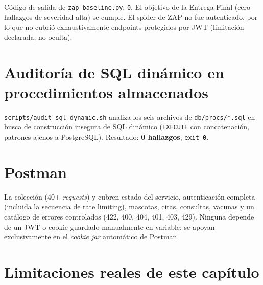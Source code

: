 C\'odigo de salida de \texttt{zap-baseline.py}: \texttt{0}. El objetivo de
la Entrega Final (cero hallazgos de severidad alta) se cumple. El spider de
ZAP no fue autenticado, por lo que no cubri\'o exhaustivamente endpoints
protegidos por JWT (limitaci\'on declarada, no oculta).

\section{Auditor\'ia de SQL din\'amico en procedimientos almacenados}

\texttt{scripts/audit-sql-dynamic.sh} analiza los seis archivos de
\texttt{db/procs/*.sql} en busca de construcci\'on insegura de SQL
din\'amico (\texttt{EXECUTE} con concatenaci\'on, patrones ajenos a
PostgreSQL). Resultado: \textbf{0 hallazgos}, \texttt{exit 0}.

\section{Postman}

La colecci\'on 
(40+ \emph{requests}) y 
cubren estado del servicio, autenticaci\'on completa (incluida la
secuencia de rate limiting), mascotas, citas, consultas, vacunas y un
cat\'alogo de errores controlados (422, 400, 404, 401, 403, 429). Ninguna
depende de un JWT o cookie guardado manualmente en variable: se apoyan
exclusivamente en el \emph{cookie jar} autom\'atico de Postman.

\section{Limitaciones reales de este cap\'itulo}

